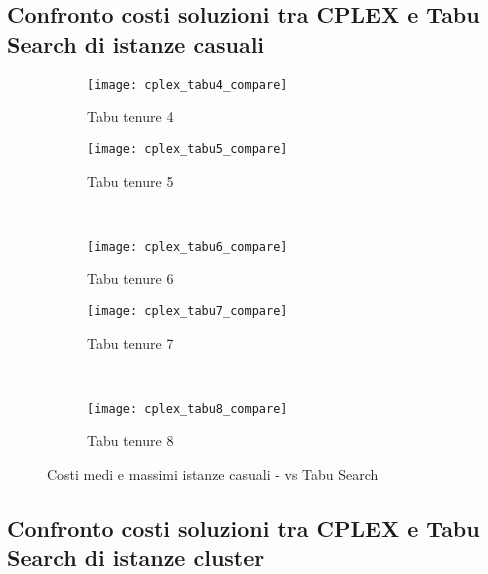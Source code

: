 \clearpage
\subsection{Confronto costi soluzioni tra CPLEX e Tabu Search di istanze casuali}

\begin{figure}[H]
	\centering
	\begin{subfigure}[b]{.45\textwidth}
			\texttt{[image: cplex\_tabu4\_compare]}
			\caption{Tabu tenure 4}
	\end{subfigure}
	\quad
	\begin{subfigure}[b]{.45\textwidth}
			\texttt{[image: cplex\_tabu5\_compare]}
			\caption{Tabu tenure 5}
	\end{subfigure}
	\\
	\begin{subfigure}[b]{.45\textwidth}
			\texttt{[image: cplex\_tabu6\_compare]}
			\caption{Tabu tenure 6}
	\end{subfigure}
	\quad
	\begin{subfigure}[b]{.45\textwidth}
			\texttt{[image: cplex\_tabu7\_compare]}
			\caption{Tabu tenure 7}
	\end{subfigure}
	\\
	\begin{subfigure}[b]{.45\textwidth}
			\texttt{[image: cplex\_tabu8\_compare]}
			\caption{Tabu tenure 8}
	\end{subfigure}
	\caption{Costi medi e massimi istanze casuali -  vs Tabu Search}
	\label{fig:costi cplex tabu completo}
\end{figure}

\clearpage
\subsection{Confronto costi soluzioni tra CPLEX e Tabu Search di istanze cluster}

